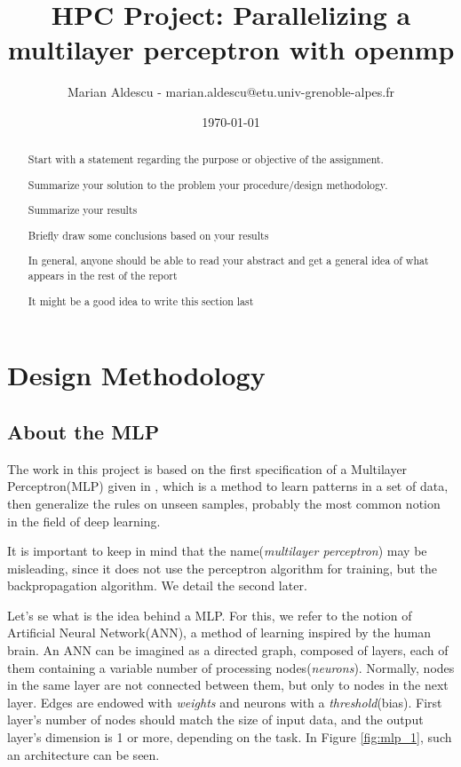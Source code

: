 \documentclass{article}
\title{HPC Project: Parallelizing a multilayer perceptron with openmp}
\author{Marian Aldescu - marian.aldescu@etu.univ-grenoble-alpes.fr}
\date{\today}
\begin{document}
	\maketitle
	
	\begin{abstract}
		Start with a statement regarding the purpose or objective of the assignment.
		
		Summarize your solution to the problem your procedure/design methodology.
		
		Summarize your results
		
		Briefly draw some conclusions based on your results
		
		In general, anyone should be able to read your abstract and get a general idea of what appears in the rest of the report
		
		It might be a good idea to write this section last
		
		
		
	\end{abstract}
	
	
\section{Design Methodology}


\subsection{About the MLP}

The work in this project is based on the first specification of a Multilayer Perceptron(MLP) given in \cite{rumelhart}, which is a method to learn patterns in a set of data, then generalize the rules on unseen samples, probably the most common notion in the field of deep learning.

It is important to keep in mind that the name(\textit{multilayer perceptron}) may be misleading, since it does not use the perceptron algorithm for training, but the backpropagation algorithm. We detail the second later.
	

Let's se what is the idea behind a MLP. For this, we refer to the notion of Artificial Neural Network(ANN), a method of learning inspired by the human brain. An ANN can be imagined as a directed graph, composed of layers, each of them containing a variable number of processing nodes(\textit{neurons}). Normally, nodes in the same layer are not connected between them, but only to nodes in the next layer. Edges are endowed with \textit{weights} and neurons with a \textit{threshold}(bias). First layer's number of nodes should match the size of input data, and the output layer's dimension is 1 or more, depending on the task. In Figure \ref{fig:mlp_1}, such an architecture can be seen.
\end{document}
